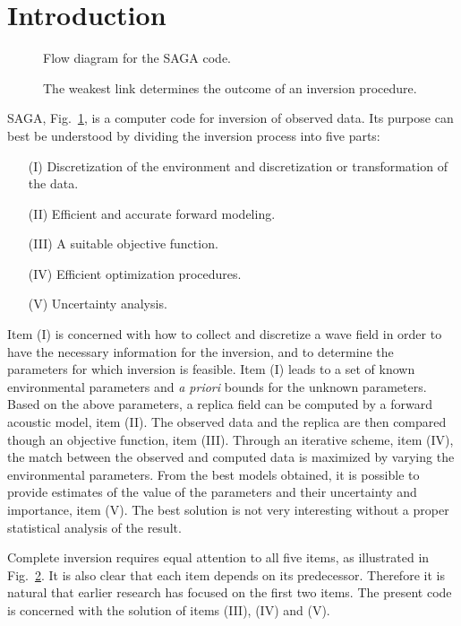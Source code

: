 \documentclass{saclantc}
\begin{document}
\section{Introduction}

\begin{figure}
\epsfxsize=13cm
\centerline{}
\caption{Flow diagram for the {\sf SAGA} code.}
\label{fig:flow}
\end{figure}

\begin{figure}
\epsfysize=3cm
\centerline{}
\caption{The weakest link determines the outcome of an inversion procedure.}
\label{fig:chain}
\end{figure}

{\sf SAGA}, Fig.\ \ref{fig:flow},  is a computer code for inversion of observed data. 
Its purpose can best be understood by dividing the inversion process into 
five parts:


\begin{itemize}
\item[(I)] Discretization of the environment and discretization 
              or transformation of the data.
\item[(II)] Efficient and accurate forward modeling.
\item[(III)] A suitable objective function.
\item[(IV)] Efficient optimization procedures.
\item[(V)] Uncertainty analysis.
\end{itemize}
Item (I) is concerned with how to collect and discretize a wave field
in order to have the necessary information for the
inversion, and to determine the parameters for which inversion is
feasible.  Item (I) leads to a set of known environmental parameters
and {\it a priori} bounds for the unknown parameters. Based on the
above parameters, a replica field can be computed by a forward
acoustic model, item (II).  The observed data and the replica are then
compared though an objective function, item (III).  Through an
iterative scheme, item (IV), the match between the observed and
computed data is maximized by varying the environmental
parameters. From the best models obtained, it is possible to provide
estimates of the value of the parameters and their uncertainty and
importance, item (V).  The best solution is not very interesting
without a proper statistical analysis of the result.

Complete inversion requires equal attention to all five items, as
illustrated in Fig.~\ref{fig:chain}.  It is also clear that each item
depends on its predecessor. Therefore it is natural that earlier
research has focused on the first two items. The present code is
concerned with the solution of items (III), (IV) and (V).
\end{document}
